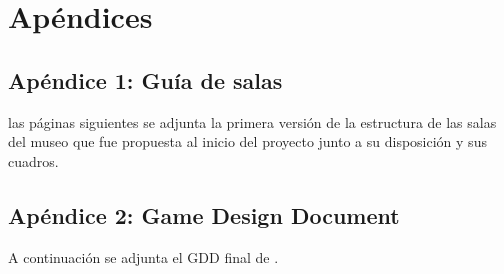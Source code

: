 \chapter{Apéndices}
\label{chap:apendices}

\section{Apéndice 1: Guía de salas}
\label{anexo:guia-salas}

 las páginas siguientes se adjunta la primera versión de la estructura de las salas del museo que fue propuesta al inicio del proyecto junto a su disposición y sus cuadros.



\section{Apéndice 2: Game Design Document}
\label{anexo:gdd}

A continuación se adjunta el \acs{GDD} final de \MineRVa.

\newpage




